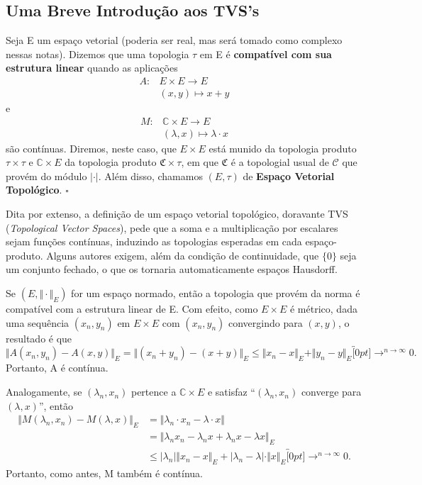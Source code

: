 \documentclass[../distribution_theory_notes.tex]{subfiles}
\begin{document}
\subsection{Uma Breve Introdução aos TVS's}
\begin{def*}
	Seja E um espaço vetorial (poderia ser real, mas será tomado como complexo nessas notas). Dizemos que uma topologia \(\tau \) em E é \textbf{compatível com sua estrutura linear} quando as aplicações
	\begin{align*}
		A: & E\times E\rightarrow E \\
		   & (x, y)\mapsto x+y
	\end{align*}
	e
	\begin{align*}
		M: & \mathbb{C}\times E\rightarrow E      \\
		   & (\lambda , x)\mapsto \lambda \cdot x
	\end{align*}
	são contínuas. Diremos, neste caso, que \(E\times E\) está munido da topologia produto \(\tau \times \tau \) e \(\mathbb{C}\times E\) da topologia produto \(\mathfrak{C}\times \tau \), em que \(\mathfrak{C}\) é a topologial
	usual de \(\mathcal{C}\) que provém do módulo \(|\cdot |.\) Além disso, chamamos \((E, \tau )\) de \textbf{Espaço Vetorial Topológico}. \(\square\)
\end{def*}
Dita por extenso, a definição de um espaço vetorial topológico, doravante TVS (\textit{Topological Vector Spaces}), pede que a soma e a multiplicação por escalares sejam funções contínuas, induzindo
as topologias esperadas em cada espaço-produto. Alguns autores exigem, além da condição de continuidade, que \(\{0\}\) seja um conjunto fechado, o que os tornaria automaticamente espaços Hausdorff.
\begin{example}
	Se \((E, \Vert \cdot  \Vert_{E})\) for um espaço normado, então a topologia que provém da norma é compatível com a estrutura linear de E. Com efeito, como \(E\times E\) é métrico, dada uma sequência
	\((x_{n}, y_{n})\) em \(E\times E\) com \((x_{n}, y_{n})\) convergindo para \((x, y)\), o resultado é que
	\[
		\Vert A(x_{n}, y_{n}) - A(x, y) \Vert_{E} = \Vert (x_{n}+y_{n}) - (x+y) \Vert_{E} \leq \Vert x_{n}-x \Vert_{E} + \Vert y_{n}-y \Vert_{E}\overbracket[0pt]{\longrightarrow}^{n\to \infty}0.
	\]
	Portanto, A é contínua.

	Analogamente, se \((\lambda_{n}, x_{n})\) pertence a \(\mathbb{C}\times E\) e satisfaz ``\((\lambda_{n}, x_{n})\) converge para \((\lambda , x)\)'', então
	\begin{align*}
		\Vert M(\lambda_{n}, x_{n})-M(\lambda , x) \Vert_{E} & =\Vert \lambda_{n}\cdot x_{n} - \lambda \cdot x \Vert                                                                                     \\
		                                                     & = \Vert \lambda_{n}x_{n}-\lambda_{n}x+\lambda_{n}x-\lambda x \Vert_{E}                                                                    \\
		                                                     & \leq |\lambda_{n}|\Vert x_{n}-x \Vert_{E}+|\lambda_{n}-\lambda |\cdot \Vert x \Vert_{E}\overbracket[0pt]{\longrightarrow}^{n\to \infty}0.
	\end{align*}
	Portanto, como antes, M também é contínua.
\end{example}
\end{document}
